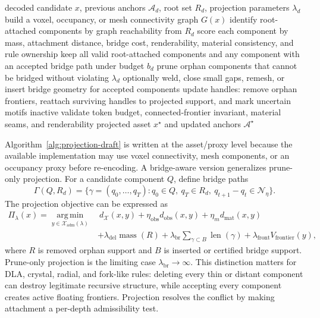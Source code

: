 \begin{algorithm}[t]
\caption{Projection to a Connected Admissible Asset}
\label{alg:projection-draft}
\begin{algorithmic}[1]
\REQUIRE decoded candidate \(x\), previous anchors \(\mathcal A_d\), root set
\(R_d\), projection parameters \(\lambda_d\)
\STATE build a voxel, occupancy, or mesh connectivity graph \(G(x)\)
\STATE identify root-attached components by graph reachability from \(R_d\)
\STATE score each component by mass, attachment distance, bridge cost,
renderability, material consistency, and rule ownership
\STATE keep all valid root-attached components and any component with an
accepted bridge path under budget \(b_d\)
\STATE prune orphan components that cannot be bridged without violating
\(\lambda_d\)
\STATE optionally weld, close small gaps, remesh, or insert bridge geometry for
accepted components
\STATE update handles: remove orphan frontiers, reattach surviving handles to
projected support, and mark uncertain motifs inactive
\STATE validate token budget, connected-frontier invariant, material seams, and
renderability
\RETURN projected asset \(x^\star\) and updated anchors \(\mathcal A^\star\)
\end{algorithmic}
\end{algorithm}

Algorithm~\ref{alg:projection-draft} is written at the asset/proxy level because
the available implementation may use voxel connectivity, mesh components, or an
occupancy proxy before re-encoding. A bridge-aware version generalizes
prune-only projection. For a candidate component \(Q\), define bridge paths
\begin{equation}
\Gamma(Q,R_d)=
\{\gamma=(q_0,\ldots,q_T):q_0\in Q,\ q_T\in R_d,\ 
q_{t+1}-q_t\in\mathcal N_\eta\}.
\end{equation}
The projection objective can be expressed as
\begin{equation}
\begin{split}
\Pi_{\lambda}(x)=
\operatorname*{arg\,min}_{y\in\mathcal X_{\mathrm{adm}}(\lambda)}
&\ d_{\mathcal X}(x,y)
+\eta_{\mathrm{obs}}d_{\mathrm{obs}}(x,y)
+\eta_m d_{\mathrm{mat}}(x,y)\\
&+\lambda_{\mathrm{del}}\operatorname{mass}(R)
+\lambda_{\mathrm{br}}\sum_{\gamma\subset B}\operatorname{len}(\gamma)
+\lambda_{\mathrm{front}}V_{\mathrm{frontier}}(y),
\end{split}
\end{equation}
where \(R\) is removed orphan support and \(B\) is inserted or certified bridge
support. Prune-only projection is the limiting case
\(\lambda_{\mathrm{br}}\rightarrow\infty\). This distinction matters for DLA,
crystal, radial, and fork-like rules: deleting every thin or distant component
can destroy legitimate recursive structure, while accepting every component
creates active floating frontiers. Projection resolves the conflict by making
attachment a per-depth admissibility test.

